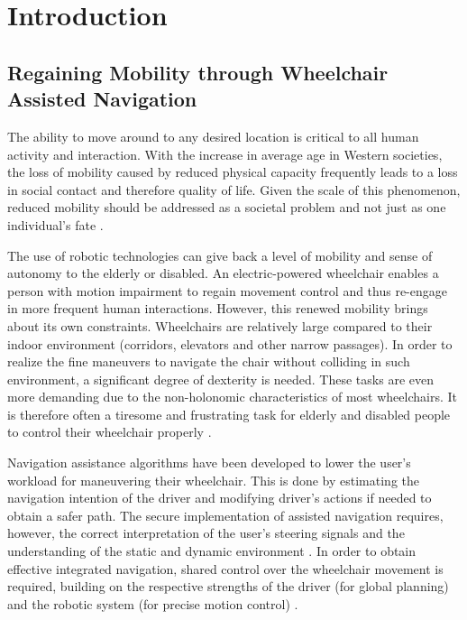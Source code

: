 \chapter{Introduction} \label{cha:Intro}

\section{Regaining Mobility through Wheelchair Assisted Navigation}
The ability to move around to any desired location is critical to all human activity and interaction. With the increase in average age in Western societies, the loss of mobility caused by reduced physical capacity frequently leads to a loss in social contact and therefore quality of life. Given the scale of this phenomenon, reduced mobility should be addressed as a societal problem and not just as one individual's fate \cite{PrasslerEtAl1999}.

The use of robotic technologies can give back a level of mobility and sense of autonomy to the elderly or disabled. An electric-powered wheelchair enables a person with motion impairment to regain movement control and thus re-engage in more frequent human interactions. However, this renewed mobility brings about its own constraints. Wheelchairs are relatively large compared to their indoor environment (corridors, elevators and other narrow passages). In order to realize the fine maneuvers to navigate the chair without colliding in such environment, a significant degree of dexterity is needed. These tasks are even more demanding due to the non-holonomic characteristics of most wheelchairs. It is therefore often a tiresome and frustrating task for elderly and disabled people to control their wheelchair properly \cite{DemeesterEtAl2003}.

Navigation assistance algorithms have been developed to lower the user's workload for maneuvering their wheelchair. This is done by estimating the navigation intention of the driver and modifying driver's actions if needed to obtain a safer path. The secure implementation of assisted navigation requires, however, the correct interpretation of the user's steering signals and the understanding of the static and dynamic environment \cite{DemeesterEtAl2012a}. In order to obtain effective integrated navigation, shared control over the wheelchair movement is required, building on the respective strengths of the driver (for global planning) and the robotic system (for precise motion control) \cite{DemeesterEtAl2003}. 

